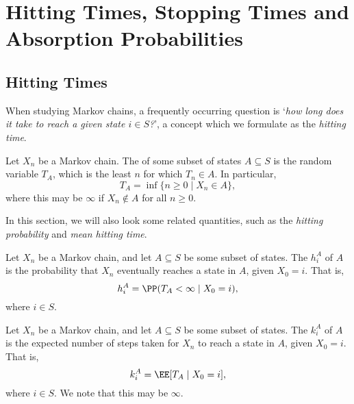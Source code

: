 \documentclass[a4paper]{scrartcl}
\begin{document}




\section{Hitting Times, Stopping Times and Absorption Probabilities}

\subsection{Hitting Times}

When studying Markov chains, a frequently occurring question is `\emph{how long does it take to reach a given state $i \in S$?}', a concept which we formulate as the \emph{hitting time}.

\begin{definition}
	Let $X_n$ be a Markov chain.
	The  of some subset of states $A \subseteq S$ is the random variable $T_A$, which is the least $n$ for which $T_n \in A$. 
	In particular,
	$$
	T_A = \inf\{n \geq 0 \mid X_n \in A\},
	$$
	where this may be $\infty$ if $X_n \not \in A$ for all $n \geq 0$.
\end{definition}

In this section, we will also look some related quantities, such as the \emph{hitting probability} and \emph{mean hitting time}.

\begin{definition}
	Let $X_n$ be a Markov chain, and let $A \subseteq S$ be some subset of states.
	The  $h^A_i$ of $A$ is the probability that $X_n$ eventually reaches a state in $A$, given $X_0 = i$. That is,
	$$
	h^A_i = \PP(T_A < \infty \mid X_0 = i),
	$$
	where $i \in S$.
\end{definition}

\begin{definition}
	Let $X_n$ be a Markov chain, and let $A \subseteq S$ be some subset of states.
	The  $k^A_i$ of $A$ is the expected number of steps taken for $X_n$ to reach a state in $A$, given $X_0 = i$. That is,
	$$
	k^A_i = \EE[T_A \mid X_0 = i],
	$$
	where $i \in S$. We note that this may be $\infty$.
\end{definition}
\end{document}
